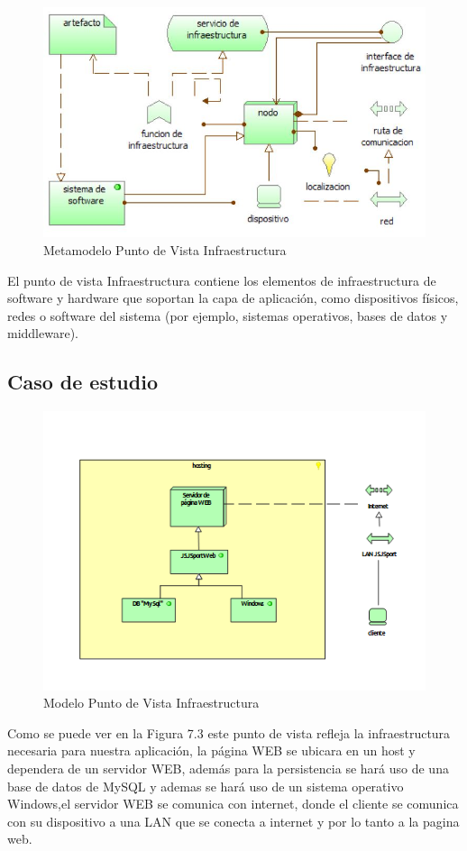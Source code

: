 \begin{figure}[th!]
	\centering
	\includegraphics[width=0.7\linewidth]{arquitectura/imagenes/modeloInfraestructura}
	\caption{Metamodelo Punto de Vista Infraestructura}
	\label{metamodeloInfraestructura}
\end{figure}
El punto de vista Infraestructura contiene los elementos de infraestructura de software y hardware que soportan la capa de aplicación, como dispositivos físicos, redes o software del sistema (por ejemplo, sistemas operativos, bases de datos y middleware).

\subsection{Caso de estudio}

\begin{figure}[th!]
	\centering
	\includegraphics[width=0.6\linewidth]{arquitectura/imagenes/PuntoVistaInfraestructura}
	\caption{Modelo Punto de Vista Infraestructura}
	\label{modeloInfraestructura}
\end{figure}

Como se puede ver en la Figura 7.3 este punto de vista refleja la infraestructura necesaria para nuestra aplicación, la página WEB se ubicara en un host y dependera de un servidor WEB, además para la persistencia se hará uso de una base de datos de MySQL y ademas se hará uso de un sistema operativo Windows,el servidor WEB se comunica con internet, donde el cliente se comunica con su dispositivo a una LAN que se conecta a internet y por lo tanto a la pagina web.

